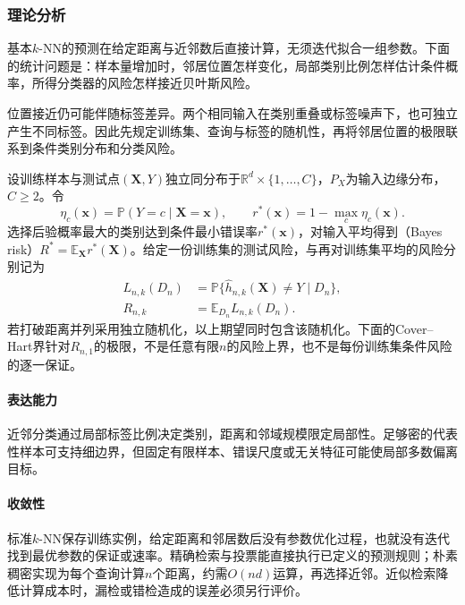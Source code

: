 \subsubsection{理论分析}
\label{sec:classification-knn-theory}

基本$k$-NN的预测在给定距离与近邻数后直接计算，无须迭代拟合一组参数。下面的统计问题是：样本量增加时，邻居位置怎样变化，局部类别比例怎样估计条件概率，所得分类器的风险怎样接近贝叶斯风险。

位置接近仍可能伴随标签差异。两个相同输入在类别重叠或标签噪声下，也可独立产生不同标签。因此先规定训练集、查询与标签的随机性，再将邻居位置的极限联系到条件类别分布和分类风险。

设训练样本与测试点$(\bm{X},Y)$独立同分布于$\mathbb{R}^d\times\{1,\ldots,C\}$，$P_X$为输入边缘分布，$C\geq2$。令
\begin{equation}
  \eta_c(\bm{x})=\mathbb{P}(Y=c\mid\bm{X}=\bm{x}),
  \qquad
  r^\ast(\bm{x})=1-\max_c\eta_c(\bm{x}).
  \label{eq:classification-local-bayes-risk}
\end{equation}
选择后验概率最大的类别达到条件最小错误率$r^\ast(\bm{x})$，对输入平均得到（Bayes risk）$R^\ast=\mathbb{E}_{\bm{X}}r^\ast(\bm{X})$。给定一份训练集的测试风险，与再对训练集平均的风险分别记为
\begin{align}
  L_{n,k}(D_n)
  &=\mathbb{P}\{\hat h_{n,k}(\bm{X})\neq Y\mid D_n\},
  \label{eq:classification-knn-conditional-risk}\\
  R_{n,k}&=\mathbb{E}_{D_n}L_{n,k}(D_n).
  \label{eq:classification-knn-expected-risk}
\end{align}
若打破距离并列采用独立随机化，以上期望同时包含该随机化。下面的Cover--Hart界针对$R_{n,1}$的极限，不是任意有限$n$的风险上界，也不是每份训练集条件风险的逐一保证。

\paragraph{表达能力}
近邻分类通过局部标签比例决定类别，距离和邻域规模限定局部性。足够密的代表性样本可支持细边界，但固定有限样本、错误尺度或无关特征可能使局部多数偏离目标。

\paragraph{收敛性}
标准$k$-NN保存训练实例，给定距离和邻居数后没有参数优化过程，也就没有迭代找到最优参数的保证或速率。精确检索与投票能直接执行已定义的预测规则；朴素稠密实现为每个查询计算$n$个距离，约需$O(nd)$运算，再选择近邻。近似检索降低计算成本时，漏检或错检造成的误差必须另行评价。

